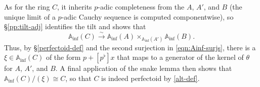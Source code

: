 \documentclass[11pt, reqno]{amsart}
\newcommand{\bA}{\mathbb{A}}
\DeclareMathOperator{\Ker}{Ker}		%
\newcommand{\Inf}{\mathrm{inf}}		%
\newcommand{\isomto}{\overset{\sim}{\longrightarrow}}
\newcommand{\ra}{\rightarrow}
\newcommand{\surjects}{\twoheadrightarrow}
\providecommand{\qxq}[1]{\quad\text{#1}\quad}
\numberwithin{equation}{numberingbase}
\theoremstyle{thms}
\theoremstyle{claims}
\theoremstyle{defs}
\theoremstyle{thms}
\theoremstyle{defs}
\theoremstyle{subsection-tweak}
\theoremstyle{subsection-tweak}
\begin{document}
As for the ring $C$, it inherits $p$-adic completeness from the $A$, $A'$, and $B$ (the unique limit of a $p$-adic Cauchy sequence is computed componentwise), so \S\ref{pp:tilt-adj} identifies the tilt and shows that 
\[
\bA_\Inf(C) \isomto \bA_\Inf(A) \times_{\bA_\Inf(A')} \bA_\Inf(B).
\] 
Thus, by \S\ref{perfectoid-def} and the second surjection in \eqref{eqn:Ainf-surjs}, there is a $\xi \in \bA_\Inf(C)$ of the form $p + [p^\flat]x$ that maps to a generator of the kernel of $\theta$ for $A$, $A'$, and $B$. A final application of the snake lemma then shows that $\bA_\Inf(C)/(\xi) \cong C$, so that $C$ is indeed perfectoid by \eqref{alt-def}.
\end{document}
